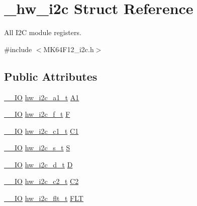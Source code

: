\hypertarget{struct__hw__i2c}{}\section{\+\_\+hw\+\_\+i2c Struct Reference}
\label{struct__hw__i2c}


All I2C module registers.  




{\ttfamily \#include $<$M\+K64\+F12\+\_\+i2c.\+h$>$}

\subsection*{Public Attributes}
\begin{DoxyCompactItemize}
\item 
\hyperlink{core__sc300_8h_aec43007d9998a0a0e01faede4133d6be}{\+\_\+\+\_\+\+IO} \hyperlink{union__hw__i2c__a1}{hw\+\_\+i2c\+\_\+a1\+\_\+t} \hyperlink{struct__hw__i2c_ae94f7a6cdde66b8cf451e97dde74003c}{A1}
\item 
\hyperlink{core__sc300_8h_aec43007d9998a0a0e01faede4133d6be}{\+\_\+\+\_\+\+IO} \hyperlink{union__hw__i2c__f}{hw\+\_\+i2c\+\_\+f\+\_\+t} \hyperlink{struct__hw__i2c_a7f4be7fb72e226cfe8ffde66c580df05}{F}
\item 
\hyperlink{core__sc300_8h_aec43007d9998a0a0e01faede4133d6be}{\+\_\+\+\_\+\+IO} \hyperlink{union__hw__i2c__c1}{hw\+\_\+i2c\+\_\+c1\+\_\+t} \hyperlink{struct__hw__i2c_ae967bd38e53acb30b8844a1ca4e82d78}{C1}
\item 
\hyperlink{core__sc300_8h_aec43007d9998a0a0e01faede4133d6be}{\+\_\+\+\_\+\+IO} \hyperlink{union__hw__i2c__s}{hw\+\_\+i2c\+\_\+s\+\_\+t} \hyperlink{struct__hw__i2c_a327449bbb229afc73bbf913379198836}{S}
\item 
\hyperlink{core__sc300_8h_aec43007d9998a0a0e01faede4133d6be}{\+\_\+\+\_\+\+IO} \hyperlink{union__hw__i2c__d}{hw\+\_\+i2c\+\_\+d\+\_\+t} \hyperlink{struct__hw__i2c_a9f2803ac724ca66a8215ddb72e9f9d17}{D}
\item 
\hyperlink{core__sc300_8h_aec43007d9998a0a0e01faede4133d6be}{\+\_\+\+\_\+\+IO} \hyperlink{union__hw__i2c__c2}{hw\+\_\+i2c\+\_\+c2\+\_\+t} \hyperlink{struct__hw__i2c_a1d1143483feaad3f2a52fa0343930f07}{C2}
\item 
\hyperlink{core__sc300_8h_aec43007d9998a0a0e01faede4133d6be}{\+\_\+\+\_\+\+IO} \hyperlink{union__hw__i2c__flt}{hw\+\_\+i2c\+\_\+flt\+\_\+t} \hyperlink{struct__hw__i2c_ae3d311f13e599552ae58d636adf0bd04}{F\+LT}
\item 

\end{DoxyCompactItemize}
